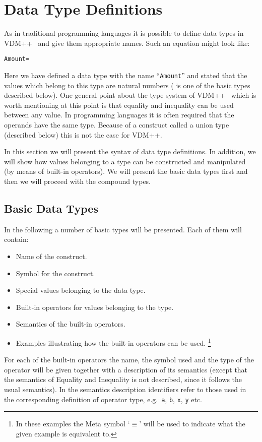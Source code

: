 \documentclass[\pformat,12pt]{article}
\newcommand{\vdmslpp}[2]{%
#2
}
\newcommand{\vdmsl}{VDM-SL}
\newcommand{\vdmpp}{VDM++}
\begin{document}
\section{Data Type Definitions}
\label{typedef}

As in traditional programming languages it is possible to define data
types in \vdmslpp{\vdmsl}{\vdmpp}\ and give them appropriate names.
Such an equation might look like:

\begin{alltt}
  Amount = 
\end{alltt}
Here we have defined a data type with the name ``{\tt Amount}'' and
stated that the values which belong to this type are natural numbers
( is one of the basic types described below). One general
point about the type system of \vdmslpp{\vdmsl}{\vdmpp}\ which is
worth mentioning at this point is that equality and inequality can be
used between any value. In programming languages it is often required
that the operands have the same type. Because of a 
construct called a union type (described below) this is not the case
for \vdmslpp{\vdmsl.}{\vdmpp.}

In this section we will present the syntax of data type
definitions. In addition, we will show how values belonging to a type
can be constructed and manipulated (by means of built-in operators).
We will present the basic data types first and then we will proceed
with the compound types.

\subsection{Basic Data Types}

In the following a number of basic types will be presented. Each of
them will contain:

\begin{itemize}
\item Name of the construct.
\item Symbol for the construct.
\item Special values belonging to the data type.
\item Built-in operators for values belonging to the type.
\item Semantics of the built-in operators.
\item Examples illustrating how the built-in operators can be used.%
  \footnote{In these examples the Meta symbol `$\equiv$' will be used
    to indicate what the given example is equivalent to.}
\end{itemize}
For each of the built-in operators the name, the symbol used and the
type of the operator will be given together with a description of its
semantics (except that the semantics of Equality and Inequality is not
described, since it follows the usual semantics). In the semantics
description identifiers refer to those used in the corresponding
definition of operator type, e.g.\ {\tt a}, {\tt b}, {\tt x}, {\tt y}
etc.
\end{document}
